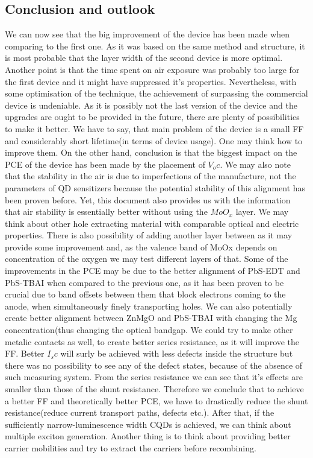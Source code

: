 \subsection{Conclusion and outlook}

We can now see that the big improvement of the device has been made when comparing to the first one. As it was based on the same method and structure, it is most probable that the layer width of the second device is more optimal. Another point is that the time spent on air exposure was probably too large for the first device and it might have suppressed it's properties. Nevertheless, with some optimisation of the technique, the achievement of surpassing the commercial device is undeniable. As it is possibly not the last version of the device and the upgrades are ought to be provided in the future, there are plenty of possibilities to make it better. We have to say, that main problem of the device is a small FF and considerably short lifetime(in terms of device usage). One may think how to improve them. On the other hand, conclusion is that the biggest impact on the PCE of the device has been made by the placement of $V_oc$. We may also note that the stability in the air is due to imperfections of the manufacture, not the parameters of QD sensitizers because the potential stability of this alignment has been proven before\cite{Chuang2014}. Yet, this document also provides us with the information that air stability is essentially better without using the $MoO_x$ layer. We may think about other hole extracting material with comparable optical and electric properties. There is also possibility of adding another layer between as it may provide some improvement and, as the valence band of MoOx depends on concentration of the oxygen we may test different layers of that. Some of the improvements in the PCE may be due to the better alignment of PbS-EDT and PbS-TBAI when compared to the previous one, as it has been proven to be crucial due to band offsets between them that block electrons coming to the anode, when simultaneously finely transporting holes. We can also potentially create better alignment between ZnMgO and PbS-TBAI with changing the Mg concentration(thus changing the optical bandgap. We could try to make other metalic contacts as well, to create better series resistance, as it will improve the FF. Better $I_sc$ will surly be achieved with less defects inside the structure but there was no possibility to see any of the defect states,  because of the absence of such measuring system. From the series resistance we can see that it's effects are smaller than those of the shunt resistance. Therefore we conclude that to achieve a better FF and theoretically better PCE, we have to drastically reduce the shunt resistance(reduce current transport paths, defects etc.). After that, if the sufficiently narrow-luminescence width CQDs is achieved, we can think about multiple exciton generation. Another thing is to think about providing better carrier mobilities and try to extract the carriers before recombining. 